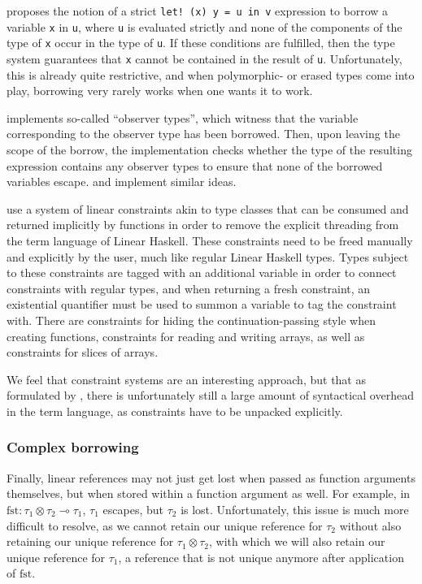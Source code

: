 \cite{wadler_linear_1990} proposes the notion of a strict \lstinline|let! (x) y = u in v| expression to borrow a variable \verb|x| in \verb|u|, where \verb|u| is evaluated strictly and none of the components of the type of \verb|x| occur in the type of \verb|u|. If these conditions are fulfilled, then the type system guarantees that \verb|x| cannot be contained in the result of \verb|u|. Unfortunately, this is already quite restrictive, and when polymorphic- or erased types come into play, borrowing very rarely works when one wants it to work.

\cite{goos_observers_1992} implements so-called ``observer types'', which witness that the variable corresponding to the observer type has been borrowed. Then, upon leaving the scope of the borrow, the implementation checks whether the type of the resulting expression contains any observer types to ensure that none of the borrowed variables escape. \cite{goos_another_2002} and \cite{kobayashi_quasi-linear_1999} implement similar ideas.

\cite{spiwack_linearly_2022} use a system of linear constraints akin to type classes that can be consumed and returned implicitly by functions in order to remove the explicit threading from the term language of Linear Haskell. These constraints need to be freed manually and explicitly by the user, much like regular Linear Haskell types. Types subject to these constraints are tagged with an additional variable in order to connect constraints with regular types, and when returning a fresh constraint, an existential quantifier must be used to summon a variable to tag the constraint with. There are constraints for hiding the continuation-passing style when creating functions, constraints for reading and writing arrays, as well as constraints for slices of arrays.

We feel that constraint systems are an interesting approach, but that as formulated by \cite{spiwack_linearly_2022}, there is unfortunately still a large amount of syntactical overhead in the term language, as constraints have to be unpacked explicitly.

\subsubsection{Complex borrowing}
Finally, linear references may not just get lost when passed as function arguments themselves, but when stored within a function argument as well. For example, in $\mathrm{fst} : \tau_1 \otimes \tau_2 \multimap \tau_1$, $\tau_1$ escapes, but $\tau_2$ is lost. Unfortunately, this issue is much more difficult to resolve, as we cannot retain our unique reference for $\tau_2$ without also retaining our unique reference for $\tau_1 \otimes \tau_2$, with which we will also retain our unique reference for $\tau_1$, a reference that is not unique anymore after application of $\mathrm{fst}$. 

